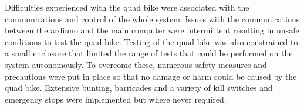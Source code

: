 \documentclass[main.tex]{subfiles}
\begin{document}
Difficulties experienced with the quad bike were associated with the communications and control of the  whole system. Issues with the communications between the ardiuno and the main computer were intermittent resulting in unsafe conditions to test the quad bike. Testing of the quad bike was also constrained to a small enclosure that limited the range of tests that could be performed on the system autonomously. To overcome these, numerous safety measures and precautions were put in place so that no damage or harm could be caused by the quad bike. Extensive bunting, barricades and a variety of kill switches and emergency stops were implemented but where never required. 
\end{document}
